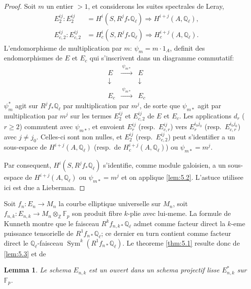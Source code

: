 \documentclass[11pt,reqno]{amsart}
\theoremstyle{plain}
\newtheorem{lemma}[theorem]{Lemma}
\theoremstyle{remark}
\DeclareMathOperator{\Sym}{Sym}
\newcommand{\Z}{\mathbb{Z}}
\newcommand{\Q}{\mathbb{Q}}
\newcommand{\F}{\mathbb{F}}
\numberwithin{equation}{section}
\begin{document}
\begin{proof}
Soit $m$ un entier $> 1$, et considerons les suites spectrales de Leray,
\[
\begin{aligned}
E_2^{ij}: E_2^{ij} &= H^i(S, R^jf_*\Q_\ell) \Rightarrow H^{i+j}(A, \Q_\ell), \\
E_{c,2}^{ij}: E_{c,2}^{ij} &= H^i_c(S, R^jf_*\Q_\ell) \Rightarrow H^{i+j}_c(A, \Q_\ell).
\end{aligned}
\]
L'endomorphisme de multiplication par $m$: $\psi_m = m \cdot 1_A$, definit des endomorphismes de $E$ et $E_c$ qui s'inscrivent dans un diagramme commutatif:
\[
\begin{array}{ccc}
E & \xrightarrow{\;\psi_{m*}\;} & E \\
\downarrow & & \downarrow \\
E_c & \xrightarrow{\;\psi_{m*}\;} & E_c
\end{array}
\]
$\psi_m^*$ agit sur $R^jf_*\Q_\ell$ par multiplication par $m^j$, de sorte que $\psi_{m*}$ agit par multiplication par $m^j$ sur les termes $E_2^{ij}$ et $E_{c,2}^{ij}$ de $E$ et $E_c$. Les applications $d_r$ ($r \geq 2$) commutent avec $\psi_{m*}$, et envoient $E_r^{ij}$ (resp.~$E_{c,r}^{ij}$) vers $E_r^{i_0j_0}$ (resp.~$E_{c,r}^{i_0j_0}$) avec $j \neq j_0$. Celles-ci sont non nulles, et $E_2^{ij}$ (resp.~$E_{c,2}^{ij}$) peut s'identifier a un sous-espace de $H^{i+j}(A, \Q_\ell)$ (resp.~de $H^{i+j}_c(A, \Q_\ell)$) ou $\psi_{m*} = m^j$.

Par consequent, $H^i(S, R^jf_*\Q_\ell)$ s'identifie, comme module galoisien, a un sous-espace de $H^{i+j}(A, \Q_\ell)$ ou $\psi_{m*} = m^j$ et on applique \ref{lem:5.2}. L'astuce utilisee ici est due a Lieberman.
\end{proof}

Soit $f_n: E_n \to M_n$ la courbe elliptique universelle sur $M_n$, soit $f_{n,k}: E_{n,k} \to M_n \otimes_\Z \F_p$ son produit fibre $k$-plie avec lui-meme. La formule de Kunneth montre que le faisceau $R^kf_{n,k*}\Q_\ell$ admet comme facteur direct la $k$-eme puissance tensorielle de $R^1f_{n*}\Q_\ell$; ce dernier en turn contient comme facteur direct le $\Q_\ell$-faisceau $\Sym^k(R^1f_{n*}\Q_\ell)$. Le theoreme \ref{thm:5.1} resulte donc de \ref{lem:5.3} et de

\begin{lemma}\label{lem:5.4}
Le schema $E_{n,k}$ est un ouvert dans un schema projectif lisse $E_{n,k}^*$ sur $\F_p$.
\end{lemma}
\end{document}
